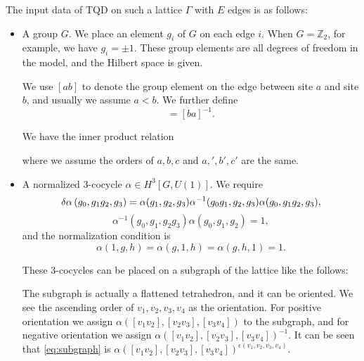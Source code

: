 \documentclass[hyperref, a4paper]{article}
\begin{document}
The input data of TQD on such a lattice $\Gamma$ with $E$ edges is as follows:
\begin{itemize}
    \item A group $G$. We place an element $g_i$ of $G$ on each edge $i$. 
    When $G = \mathbb{Z}_2$, for example, we have $g_i = \pm 1$. 
    These group elements are all degrees of freedom in the model, and the Hilbert space is given. 

    We use $[a b]$ to denote the group element on the edge between site $a$ and site $b$, and usually we 
    assume $a < b$. We further define 
    \begin{equation}
        [ab] = [ba]^{-1}.
    \end{equation}

    We have the inner product relation 
     
    where we assume the orders of $a, b, c$ and $a,', b', c'$ are the same.

    \item A normalized 3-cocycle $\alpha \in H^3[G, U(1)]$. We require 
    \begin{equation}
        \var{\alpha}(g_0, g_1 g_2, g_3) = \alpha(g_1, g_2, g_3) \alpha^{-1}(g_0 g_1, g_2, g_3) 
        \alpha(g_0, g_1 g_2, g_3),
        \label{eq:cocycle-1}
    \end{equation}
    \begin{equation}
        \alpha^{-1}(g_0, g_1, g_2 g_3) \alpha(g_0, g_1, g_2) = 1,
        \label{eq:cocycle-2}
    \end{equation}
    and the normalization condition is 
    \begin{equation}
        \alpha(1, g, h) = \alpha(g, 1, h) = \alpha(g, h, 1) = 1.
    \end{equation}

    These 3-cocycles can be placed on a subgraph of the lattice like the follows:
    
    The subgraph is actually a flattened tetrahedron, and it can be oriented.
    We see the ascending order of $v_1, v_2, v_3, v_4$ as the orientation.
    For positive orientation we assign $\alpha([v_1 v_2], [v_2 v_3], [v_3 v_4])$ to the subgraph,
    and for negative orientation we assign $\alpha([v_1 v_2], [v_2 v_3], [v_3 v_4])^{-1}$.
    It can be seen that \eqref{eq:subgraph} is $\alpha([v_1 v_2], [v_2 v_3], [v_3 v_4])^{\epsilon(v_1, v_2, v_3, v_4)}$.


\end{itemize}
\end{document}
